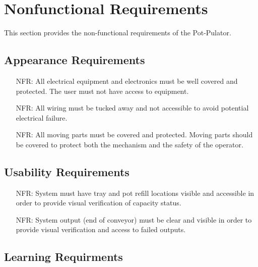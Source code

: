 \documentclass[12pt]{article}
\newcounter{nfrnum} %
\begin{document}
  
  
  
  \section{Nonfunctional Requirements}
  This section provides the non-functional requirements of the Pot-Pulator.
  \subsection{Appearance Requirements}

  \noindent 
  \begin{itemize}
  
  \item[NFR\refstepcounter{nfrnum}\thenfrnum \label{NFR_Appearance1}:]
    All electrical equipment and electronics must be well covered and protected. The user must not have access to equipment.
  
  \item[NFR\refstepcounter{nfrnum}\thenfrnum \label{NFR_Appearance2}:]
    All wiring must be tucked away and not accessible to avoid potential electrical failure.
  
  \item[NFR\refstepcounter{nfrnum}\thenfrnum \label{NFR_Appearance3}:]
    All moving parts must be covered and protected. Moving parts should be covered to protect both the mechanism and the safety of the operator.

  \end{itemize}
  
  \subsection{Usability Requirements}

  \noindent \begin{itemize}
  
  \item[NFR\refstepcounter{nfrnum}\thenfrnum \label{NFR_Usability1}:]
  System must have tray and pot refill locations visible and accessible in order to provide visual verification of capacity status.
  
  \item[NFR\refstepcounter{nfrnum}\thenfrnum \label{NFR_Usability2}:]
  System output (end of conveyor) must be clear and visible in order to provide visual verification and access to failed outputs.
  \end{itemize}
  \subsection{Learning Requirments}
\end{document}
